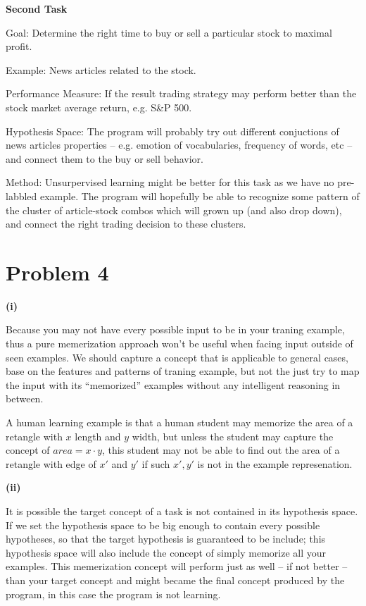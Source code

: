 \documentclass[12pt]{article}
\begin{document}
\noindent\textbf{Second Task}

Goal: Determine the right time to buy or sell a particular stock to maximal profit.

Example: News articles related to the stock.

Performance Measure: If the result trading strategy may perform better than the stock market average return, e.g. S\&P 500.

Hypothesis Space: The program will probably try out different conjuctions of news articles properties -- e.g. emotion of vocabularies, frequency of words, etc -- and connect them to the buy or sell behavior.

Method: Unsurpervised learning might be better for this task as we have no pre-labbled example. The program will hopefully be able to recognize some pattern of the cluster of article-stock combos which will grown up (and also drop down), and connect the right trading decision to these clusters.

\section{Problem 4}

\textbf{(i)}

Because you may not have every possible input to be in your traning example, thus a pure memerization approach won't be useful when facing input outside of seen examples. We should capture a concept that is applicable to general cases, base on the features and patterns of traning example, but not the just try to map the input with its ``memorized'' examples without any intelligent reasoning in between.

A human learning example is that a human student may memorize the area of a retangle with $x$ length and $y$ width, but unless the student may capture the concept of $area = x \cdot y$, this student may not be able to find out the area of a retangle with edge of $x'$ and $y'$ if such $x', y'$ is not in the example represenation.\newline

\noindent\textbf{(ii)}

It is possible the target concept of a task is not contained in its hypothesis space. If we set the hypothesis space to be big enough to contain every possible hypotheses, so that the target hypothesis is guaranteed to be include; this hypothesis space will also include the concept of simply memorize all your examples. This memerization concept will perform just as well -- if not better -- than your target concept and might became the final concept produced by the program, in this case the program is not learning.
\end{document}
